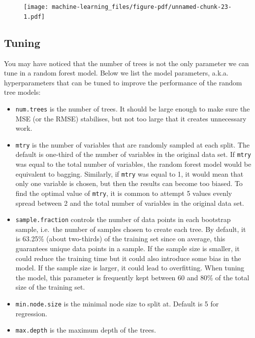 \documentclass[
  letterpaper,
  DIV=11,
  numbers=noendperiod]{scrreprt}
\begin{document}
\begin{figure}[H]

{\centering \texttt{[image: machine-learning\_files/figure-pdf/unnamed-chunk-23-1.pdf]}

}

\end{figure}

\hypertarget{tuning}{%
\subsection{Tuning}\label{tuning}}

You may have noticed that the number of trees is not the only parameter
we can tune in a random forest model. Below we list the model
parameters, a.k.a. hyperparameters that can be tuned to improve the
performance of the random tree models:

\begin{itemize}
\item
  \texttt{num.trees} is the number of trees. It should be large enough
  to make sure the MSE (or the RMSE) stabilises, but not too large that
  it creates unnecessary work.
\item
  \texttt{mtry} is the number of variables that are randomly sampled at
  each split. The default is one-third of the number of variables in the
  original data set. If \texttt{mtry} was equal to the total number of
  variables, the random forest model would be equivalent to bagging.
  Similarly, if \texttt{mtry} was equal to 1, it would mean that only
  one variable is chosen, but then the results can become too biased. To
  find the optimal value of \texttt{mtry}, it is common to attempt 5
  values evenly spread between 2 and the total number of variables in
  the original data set.
\item
  \texttt{sample.fraction} controls the number of data points in each
  bootstrap sample, i.e.~the number of samples chosen to create each
  tree. By default, it is 63.25\% (about two-thirds) of the training set
  since on average, this guarantees unique data points in a sample. If
  the sample size is smaller, it could reduce the training time but it
  could also introduce some bias in the model. If the sample size is
  larger, it could lead to overfitting. When tuning the model, this
  parameter is frequently kept between 60 and 80\% of the total size of
  the training set.
\item
  \texttt{min.node.size} is the minimal node size to split at. Default
  is 5 for regression.
\item
  \texttt{max.depth} is the maximum depth of the trees.
\end{itemize}
\end{document}
